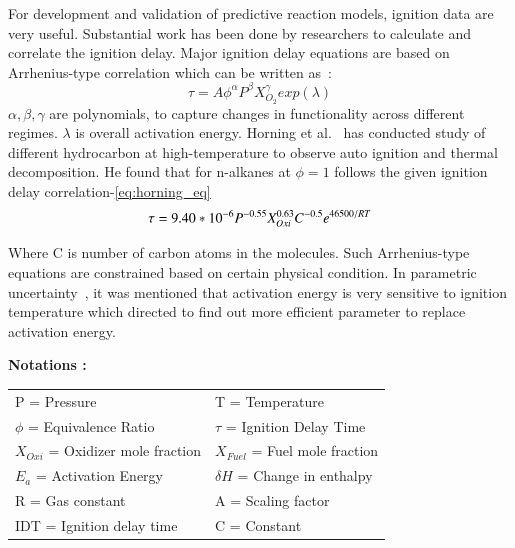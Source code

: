 \documentclass[preprint,12pt]{elsarticle}
\begin{document}
		For development and validation of predictive reaction models, ignition data are very useful. Substantial work has been done by researchers to calculate and correlate the ignition delay. Major ignition delay equations are based on Arrhenius-type correlation which can be written as~\cite{goldsborough2009chemical}:
		\begin{equation}
		\tau = A \phi^\alpha P^\beta X_{O_2}^\gamma exp(\lambda)
		\end{equation}
		$\alpha, \beta, \gamma$ are polynomials, to capture changes in functionality across different regimes. $\lambda$ is overall activation energy. Horning et al.~\cite{horning} has conducted study of different hydrocarbon at high-temperature to observe auto ignition and thermal decomposition. He found that for n-alkanes at $\phi =1$ follows the given ignition delay correlation-\ref{eq:horning_eq}
		\begin{equation}\label{eq:horning_eq}
		\tau = 9.40  * \space 10^{-6} P^{-0.55} X_{Oxi}^{0.63} C^{-0.5} e^{46500/RT}
		\end{equation}
		
		Where C is number of carbon atoms in the molecules. Such Arrhenius-type equations are constrained based on certain physical condition. In parametric uncertainty~\cite{horning}, it was mentioned that activation energy is very sensitive to ignition temperature which directed to find out more efficient parameter to replace activation energy. 
		
			\vspace{1 mm}
			\textbf{Notations :}
			
			\begin{table}[htpb!]\label{table:Notation}
				\begin{tabular}{ l l }	
					P = Pressure &	T = Temperature \\
					$\phi$ = Equivalence Ratio & $\tau$ = Ignition Delay Time \\
					$X_{Oxi}$ = Oxidizer mole fraction &  $X_{Fuel}$ = Fuel mole fraction   \\
					$E_a$ = Activation Energy & $\delta H$ = Change in enthalpy \\
					R = Gas constant & 		A = Scaling factor \\
					IDT = Ignition delay time & C = Constant \\
				\end{tabular}
			\end{table}
			\vspace{3mm}
		
\end{document}
